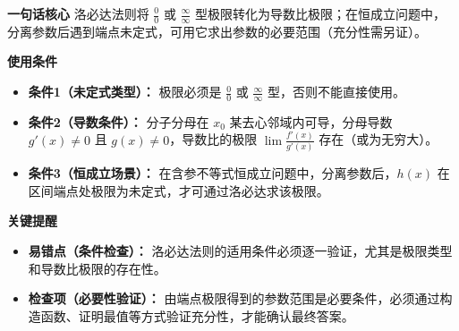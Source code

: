 \begin{summarybox}
	\textbf{\textcolor{CSummary}{一句话核心}}
	洛必达法则将 $\frac{0}{0}$ 或 $\frac{\infty}{\infty}$ 型极限转化为导数比极限；在恒成立问题中，分离参数后遇到端点未定式，可用它求出参数的必要范围（充分性需另证）。

	\medskip
	\textbf{\textcolor{CSummary}{使用条件}}
	\begin{itemize}[leftmargin=*, itemsep=0.5em, topsep=0.4em]
		\item \textbf{条件1（未定式类型）：} 极限必须是 $\frac{0}{0}$ 或 $\frac{\infty}{\infty}$ 型，否则不能直接使用。
		\item \textbf{条件2（导数条件）：} 分子分母在 $x_0$ 某去心邻域内可导，分母导数 $g'(x)\neq0$ 且 $g(x)\neq0$，导数比的极限 $\lim\frac{f'(x)}{g'(x)}$ 存在（或为无穷大）。
		\item \textbf{条件3（恒成立场景）：} 在含参不等式恒成立问题中，分离参数后，$h(x)$ 在区间端点处极限为未定式，才可通过洛必达求该极限。
	\end{itemize}

	\medskip
	\textbf{\textcolor{CSummary}{关键提醒}}
	\begin{itemize}[leftmargin=*, itemsep=0.5em, topsep=0.4em]
		\item \textbf{易错点（条件检查）：} 洛必达法则的适用条件必须逐一验证，尤其是极限类型和导数比极限的存在性。
		\item \textbf{检查项（必要性验证）：} 由端点极限得到的参数范围是必要条件，必须通过构造函数、证明最值等方式验证充分性，才能确认最终答案。
	\end{itemize}

\end{summarybox}
